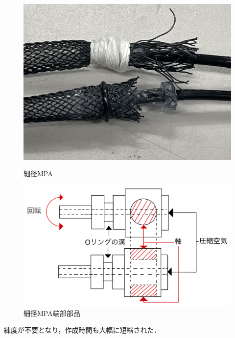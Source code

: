 \documentclass{jarticle}
\begin{document}
\vspace*{-6mm}
\begin{figure}[H]
  \begin{minipage}[b]{0.47\columnwidth}
    \centering
    \includegraphics[scale=0.18]{mpa_oring_1.jpg}
    \vspace{-2mm}
    \caption{細径MPA}
    \label{fig:OringMPA}
  \end{minipage}
  \hspace{0.04\columnwidth}
  \begin{minipage}[b]{0.47\columnwidth}
    \centering
    \includegraphics[scale=0.045]{MPA_irast.jpg}
    \vspace{-3mm}
    \caption{細径MPA端部部品}
    \label{fig:MPAparts}
  \end{minipage}
\end{figure}

\noindent 練度が不要となり，作成時間も大幅に短縮された．
\end{document}
